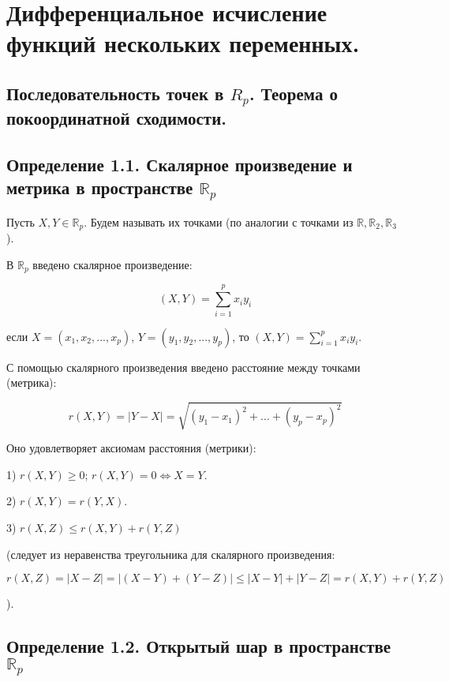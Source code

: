 {
\section{Дифференциальное исчисление функций нескольких переменных.}
\subsection{Последовательность точек в \( R_p \). Теорема о покоординатной сходимости.}

\subsection*{Определение 1.1. Скалярное произведение и метрика в пространстве \( \mathbb{R}_p \)}

Пусть \( X, Y \in \mathbb{R}_p \). Будем называть их точками (по аналогии с точками из \( \mathbb{R}, \mathbb{R}_2, \mathbb{R}_3 \)).

В \( \mathbb{R}_p \) введено скалярное произведение:



\[
(X, Y) = \sum_{i=1}^{p} x_i y_i
\]



если \( X = (x_1, x_2, ..., x_p) \), \( Y = (y_1, y_2, ..., y_p) \), то \( (X, Y) = \sum_{i=1}^{p} x_i y_i \).

С помощью скалярного произведения введено расстояние между точками (метрика):



\[
r(X, Y) = |Y - X| = \sqrt{(y_1 - x_1)^2 + ... + (y_p - x_p)^2}
\]



Оно удовлетворяет аксиомам расстояния (метрики):

1) \( r(X, Y) \geq 0 \); \( r(X, Y) = 0 \Leftrightarrow X = Y \).

2) \( r(X, Y) = r(Y, X) \).

3) \( r(X, Z) \leq r(X, Y) + r(Y, Z) \)

(следует из неравенства треугольника для скалярного произведения:



\[
r(X, Z) = |X - Z| = |(X - Y) + (Y - Z)| \leq |X - Y| + |Y - Z| = r(X, Y) + r(Y, Z)
\]

).

\subsection*{Определение 1.2. Открытый шар в пространстве \( \mathbb{R}_p \)}

}
